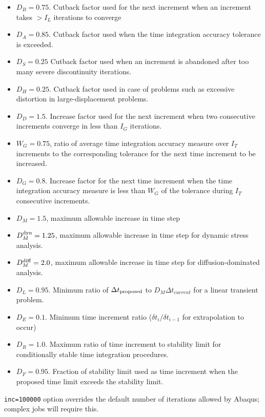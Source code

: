 \documentclass[10pt,letterpaper,oneside]{report}
\newcommand{\scas}[1]{\mbox{{\scriptsize{${\rm{#1}}$}}}{}}
\begin{document}
\begin{itemize}
\item $D_B = 0.75$.  Cutback factor used for the next increment when an increment takes $> I_L$ iterations to converge
\item $D_A = 0.85$.  Cutback factor used when the time integration accuracy tolerance is exceeded.
\item $D_S = 0.25 $  Cutback factor used when an increment is abandoned after too many severe discontinuity iterations. 
\item $D_H = 0.25$.  Cutback factor used in case of problems such as excessive distortion in large-displacement problems.  
\item $D_D = 1.5$.  Increase factor used for the next increment when two consecutive increments converge in less than $I_G$ iterations.
\item $W_G = 0.75$, ratio of average time integration accuracy measure over $I_T$ increments to the corresponding tolerance for the next time increment to be increased.
\item $D_G = 0.8$.  Increase factor for the next time increment when the time integration accuracy measure is less than $W_G$ of the tolerance during $I_T$ consecutive increments.
\item $D_M = 1.5$, maximum allowable increase in time step
\item $D_M^{\scas{dyn}} = 1.25$, maximum allowable increase in time step for dynamic stress analysis.
\item $D_M^{\scas{diff}} = 2.0$, maximum allowable increase in time step for diffusion-dominated analysis.
\item $D_L = 0.95$.  Minimum ratio of $\Delta t_{\scas{proposed}}$ to $D_M \Delta t_{current}$ for a linear transient problem.
\item $D_E = 0.1$.  Minimum time increment ratio ($\delta t_i / \delta t_{i-1}$ for extrapolation to occur)
\item $D_R = 1.0$.  Maximum ratio of time increment to stability limit for conditionally stable time integration procedures.
\item $D_F = 0.95$.  Fraction of stability limit used as time increment when the proposed time limit exceeds the stability limit. 
\end{itemize}
\texttt{inc=100000} option overrides the default number of iterations allowed by Abaqus; complex jobs will require this. 



\end{document}

